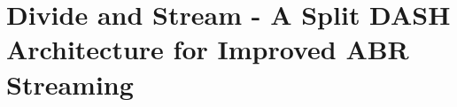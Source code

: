 \chapter[SpDASH]{Divide and Stream - A Split DASH Architecture for Improved ABR Streaming}
\label{chapter05}
\noindent

\renewcommand{\relpath}[1]{Chapters/05.SpDASH/}
\graphicspath{{Chapters/05.SpDASH/}}

\newcommand{\red}[1]{\textcolor{red}{#1}}
\newcommand{\bel}{\textit{Belovezha}}
\newcommand{\servname}{\textit{BiFrost}}
\newcommand{\cliname}{\bel\ client}



%





